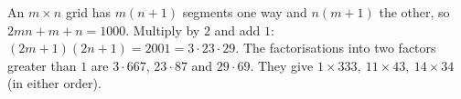 An $m\times n$ grid has $m(n+1)$ segments one way and $n(m+1)$ the other, so $2mn+m+n=1000$. Multiply by $2$ and add $1$: $(2m+1)(2n+1)=2001=3\cdot23\cdot29$. The factorisations into two factors greater than $1$ are $3\cdot667$, $23\cdot87$ and $29\cdot69$. They give $\boxed{1\times333,\ 11\times43,\ 14\times34}$ (in either order).
